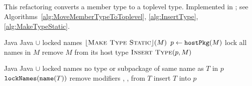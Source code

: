 \subsection{}
This refactoring converts a member type to a toplevel type. Implemented in ; see Algorithms~\ref{alg:MoveMemberTypeToToplevel}, \ref{alg:InsertType}, \ref{alg:MakeTypeStatic}.

\begin{algorithm}[p]
\caption{$\refactoring{Move Member Type to Toplevel}(M : \type{MemberType})$}
\label{alg:MoveMemberTypeToToplevel}
\begin{algorithmic}[1]
\REQUIRE Java
\ENSURE Java $\cup$ locked names
\medskip
{}
  \STATE $\lfloor\textsc{Make Type Static}\rfloor(M)$
\ENDIF
\STATE $p \leftarrow \text{\texttt{hostPkg}}(M)$
\STATE lock all names in $M$
\STATE remove $M$ from its host type
\STATE $\textsc{Insert Type}(p, M)$
\end{algorithmic}
\end{algorithm}

\begin{algorithm}[p]
\caption{$\refactoring{Insert Type}(p : \type{Package}, T : \type{ClassOrInterface})$}
\label{alg:InsertType}
\begin{algorithmic}[1]
\REQUIRE Java
\ENSURE Java $\cup$ locked names
\medskip
\STATE \assert no type or subpackage of same name as $T$ in $p$
\STATE $\text{\texttt{lockNames}}(\text{\texttt{name}}(T))$
\STATE remove modifiers , ,  from $T$
\STATE insert $T$ into $p$
\end{algorithmic}
\end{algorithm}

